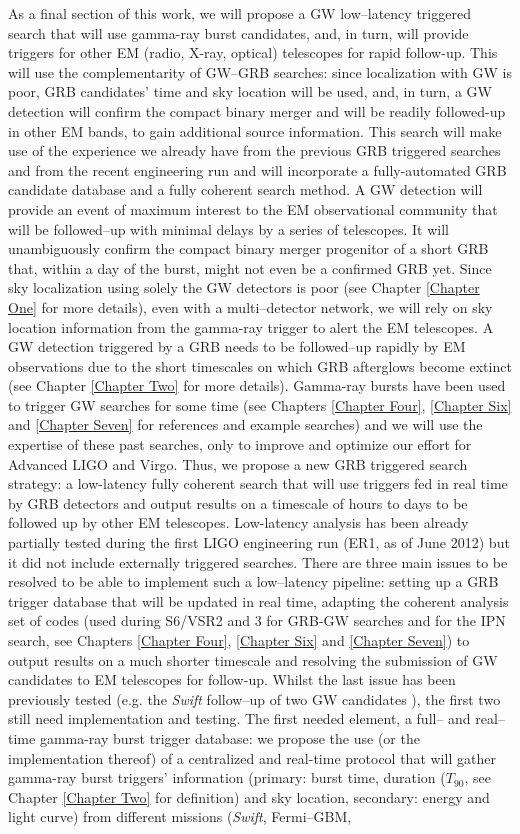 As a final section of this work, we will propose a GW low--latency triggered search that will use gamma-ray burst  candidates, and, in turn, will provide triggers for other EM (radio, X-ray, optical) telescopes for rapid follow-up. This will use the complementarity of GW--GRB searches: since localization with GW is poor, GRB candidates' time and sky location will be used, and, in turn, a GW detection will confirm the compact binary merger and will be readily followed-up in other EM bands, to gain additional source information. This search will make use of the experience we already have from the previous GRB triggered searches and from the recent engineering run and will incorporate a fully-automated GRB candidate database and a fully coherent search method. A GW detection will provide an event of maximum interest to the EM observational community that will be followed--up with minimal delays by a series of telescopes. It will unambiguously confirm the compact binary merger progenitor of a short GRB that, within a day of the burst, might not even be a confirmed GRB yet. Since sky localization using solely the GW detectors is poor (see Chapter \ref{Chapter One} for more details), even with a multi--detector network, we will rely on sky location information from the gamma-ray trigger to alert the EM telescopes. A GW detection triggered by a GRB needs to be followed--up rapidly by EM observations due to the short timescales on which GRB afterglows become extinct (see Chapter \ref{Chapter Two} for more details). Gamma-ray bursts have been used to trigger GW searches for some time (see Chapters \ref{Chapter Four}, \ref{Chapter Six} and \ref{Chapter Seven} for references and example searches) and we will use the expertise of these past searches, only to improve and optimize our effort for Advanced LIGO and Virgo. Thus, we propose a new GRB triggered search strategy: a low-latency fully coherent search that will use triggers fed in real time by GRB detectors and output results on a timescale of hours to days to be followed up by other EM telescopes. Low-latency analysis has been already partially tested during the first LIGO engineering run (ER1, as of June 2012) but it did not include externally triggered searches. There are three main issues to be resolved to be able to implement such a low--latency pipeline: setting up a GRB trigger database that will be updated in real time, adapting the coherent analysis set of codes (used during S6/VSR2 and 3 for GRB-GW searches and for the IPN search, see Chapters \ref{Chapter Four}, \ref{Chapter Six} and \ref{Chapter Seven}) to output results on a much shorter timescale and resolving the submission of GW candidates to EM telescopes for follow-up. Whilst the last issue has been previously tested (e.g. the \emph{Swift} follow--up of two GW candidates \cite{Evans:2012hd}), the first two still need implementation and testing. The first needed element, a full-- and real--time gamma-ray burst trigger database: we propose the use (or the implementation thereof) of a centralized and real-time protocol that will gather gamma-ray burst triggers' information (primary: burst time, duration ($T_{90}$, see Chapter \ref{Chapter Two} for definition) and sky location, secondary: energy and light curve) from different  missions (\emph{Swift}, Fermi--GBM, 